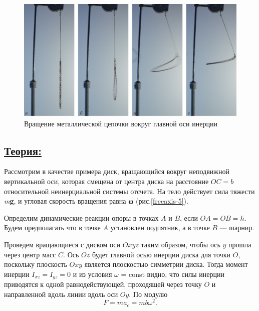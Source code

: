 \documentclass[14pt,a4paper,oneside]{extarticle}	%
\begin{document}
\begin{figure}[H]
	\centering 	
	\includegraphics[width=0.9\linewidth]{freeaxis-4.png}
	\caption{Вращение металлической цепочки вокруг главной оси инерции}
	\label{freeaxis-4}
\end{figure}

\newpage
\subsection*{\underline{Теория:}}

Рассмотрим в качестве примера диск, вращающийся вокруг неподвижной вертикальной оси, которая смещена от центра диска на расстояние $ OC=b $ относительной неинерциальной системы отсчета. 
На тело действует сила тяжести \textit{m}\textbf{g}, и угловая скорость вращения равна \textbf{ω} (рис.\ref{freeaxis-5}).

Определим динамические реакции опоры в точках $ A $ и $ B $, если $ OA = OB = h $.
Будем предполагать что в точке $ A $ установлен подпятник, а в точке $ B $ — шарнир.

Проведем вращающиеся с диском оси $ Oxyz $ таким образом, чтобы ось $ y $ прошла через центр масс $ C $.
Ось $ Oz $ будет главной осью инерции диска для точки $ O $, поскольку плоскость $ Oxy $ является плоскостью симметрии диска.
Тогда момент инерции $ I_{xz} = I_{yz} = 0 $ и из условия $ \omega $ = const видно, что силы инерции приводятся к одной равнодействующей, проходящей через точку $ O $ и направленной вдоль линии вдоль оси $Oy$.
По модулю $$ F = ma_{c} = mb\omega^{2}. $$
\end{document}
